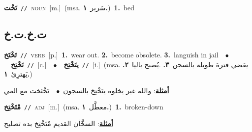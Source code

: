 \documentclass[10pt,a4paper,twoside]{article} %
\begin{document}
\begin{multicols}{2}
{\setlength\topsep{0pt}\textbf{\foreignlanguage{arabic}{تَخْت}}\ {\color{gray}\texttt{//}\color{black}}\ \textsc{noun}\ [m.]\ \color{gray}(msa. \foreignlanguage{arabic}{سَرير}~\foreignlanguage{arabic}{\textbf{١.}})\color{black}\ \textbf{1.}~bed\ } \vspace{2mm}

\vspace{-3mm}
\subsection*{\color{blue}\foreignlanguage{arabic}{ت.خ.ت.خ}\color{blue}{}} 

{\setlength\topsep{0pt}\textbf{\foreignlanguage{arabic}{تَخْتَخ}}\ {\color{gray}\texttt{//}\color{black}}\ \textsc{verb}\ [p.]\ \textbf{1.}~wear out.  \textbf{2.}~become obsolete.  \textbf{3.}~languish in jail\ \ $\bullet$\ \ \setlength\topsep{0pt}\textbf{\foreignlanguage{arabic}{تَخْتِخ}}\ {\color{gray}\texttt{//}\color{black}}\ [c.]\ \ $\bullet$\ \ \setlength\topsep{0pt}\textbf{\foreignlanguage{arabic}{يتَخْتِخ}}\ {\color{gray}\texttt{//}\color{black}}\ [i.]\ \color{gray}(msa. \foreignlanguage{arabic}{يقضي فترة طويلة بالسجن}~\foreignlanguage{arabic}{\textbf{٣.}}  .\foreignlanguage{arabic}{يُصبح باليا}~\foreignlanguage{arabic}{\textbf{٢.}}  \foreignlanguage{arabic}{يَهترِئ}~\foreignlanguage{arabic}{\textbf{١.}})\color{black}\  \begin{flushright}\color{gray}\foreignlanguage{arabic}{\textbf{\underline{\foreignlanguage{arabic}{أمثلة}}}: والله غير يخلوه يتَخْتِخ بالسجون\ $\bullet$\ \  تَخْتَخت مع المي}\end{flushright}\color{black}} \vspace{2mm}

{\setlength\topsep{0pt}\textbf{\foreignlanguage{arabic}{مْتَخْتِخ}}\ {\color{gray}\texttt{//}\color{black}}\ \textsc{adj}\ [m.]\ \color{gray}(msa. \foreignlanguage{arabic}{معطَّل}~\foreignlanguage{arabic}{\textbf{١.}})\color{black}\ \textbf{1.}~broken-down\  \begin{flushright}\color{gray}\foreignlanguage{arabic}{\textbf{\underline{\foreignlanguage{arabic}{أمثلة}}}: السخَّأن القديم مْتَخْتِخ بده تصليح}\end{flushright}\color{black}} \vspace{2mm}


\end{multicols}
\end{document}
